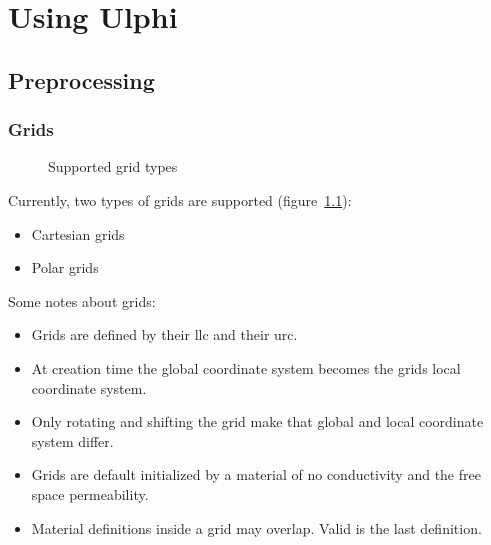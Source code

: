 %
%
%
%
%

\chapter{Using Ulphi}
\label{cha:practical-aspects}

\section{Preprocessing}
\label{sec:preprocessing}

\subsection{Grids}
\label{sec:grids}

\begin{figure}
  \centering
    \hfil
    \hfil
    \hfil
  \caption{Supported grid types}
  \label{fig:sup-grid-types}
\end{figure}
Currently, two types of grids are supported (figure~\ref{fig:sup-grid-types}):
\begin{itemize}
\item Cartesian grids
\item Polar grids
\end{itemize}
Some notes about grids:
\begin{itemize}
\item Grids are defined by their \gls{llc} and their \gls{urc}.
\item At creation time the global coordinate system becomes the grids
  local coordinate system.
\item Only rotating and shifting the grid make that global and local
  coordinate system differ.
\item Grids are default initialized by a material of no conductivity and the
  free space permeability.
\item Material definitions inside a grid may overlap. Valid is the
  last definition.
\end{itemize}

